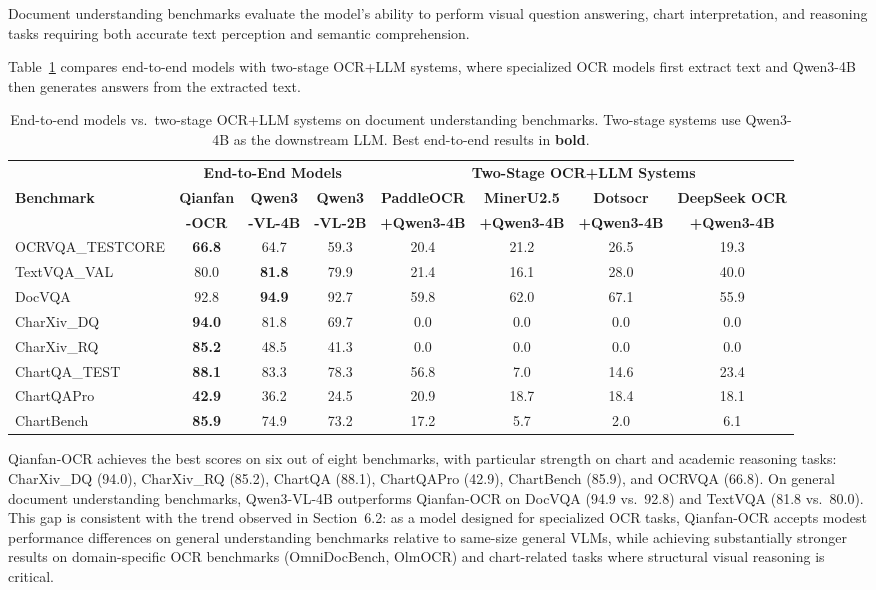 \documentclass[dvipsnames]{article}
\begin{document}
Document understanding benchmarks evaluate the model's ability to perform visual question answering, chart interpretation, and reasoning tasks requiring both accurate text perception and semantic comprehension.

Table~\ref{tab:doc_understanding_comparison} compares end-to-end models with two-stage OCR+LLM systems, where specialized OCR models first extract text and Qwen3-4B then generates answers from the extracted text.

\begin{table}[H]
\centering
\small
\setlength{\tabcolsep}{4pt}
\begin{tabular}{l|ccc|cccc}
\toprule
 & \multicolumn{3}{c|}{\textbf{End-to-End Models}} & \multicolumn{4}{c}{\textbf{Two-Stage OCR+LLM Systems}} \\
\cmidrule(lr){2-4} \cmidrule(lr){5-8}
\textbf{Benchmark} & \textbf{Qianfan} & \textbf{Qwen3} & \textbf{Qwen3} & \textbf{PaddleOCR} & \textbf{MinerU2.5} & \textbf{Dotsocr} & \textbf{DeepSeek OCR} \\
 & \textbf{-OCR} & \textbf{-VL-4B} & \textbf{-VL-2B} & \textbf{+Qwen3-4B} & \textbf{+Qwen3-4B} & \textbf{+Qwen3-4B} & \textbf{+Qwen3-4B} \\
\midrule
OCRVQA\_TESTCORE & \textbf{66.8} & 64.7 & 59.3 & 20.4 & 21.2 & 26.5 & 19.3 \\
TextVQA\_VAL & 80.0 & \textbf{81.8} & 79.9 & 21.4 & 16.1 & 28.0 & 40.0 \\
DocVQA & 92.8 & \textbf{94.9} & 92.7 & 59.8 & 62.0 & 67.1 & 55.9 \\
CharXiv\_DQ & \textbf{94.0} & 81.8 & 69.7 & 0.0 & 0.0 & 0.0 & 0.0 \\
CharXiv\_RQ & \textbf{85.2} & 48.5 & 41.3 & 0.0 & 0.0 & 0.0 & 0.0 \\
ChartQA\_TEST & \textbf{88.1} & 83.3 & 78.3 & 56.8 & 7.0 & 14.6 & 23.4 \\
ChartQAPro & \textbf{42.9} & 36.2 & 24.5 & 20.9 & 18.7 & 18.4 & 18.1 \\
ChartBench & \textbf{85.9} & 74.9 & 73.2 & 17.2 & 5.7 & 2.0 & 6.1 \\
\bottomrule
\end{tabular}
\caption{End-to-end models vs.\ two-stage OCR+LLM systems on document understanding benchmarks. Two-stage systems use Qwen3-4B as the downstream LLM. Best end-to-end results in \textbf{bold}.}
\label{tab:doc_understanding_comparison}
\end{table}

Qianfan-OCR achieves the best scores on six out of eight benchmarks, with particular strength on chart and academic reasoning tasks: CharXiv\_DQ (94.0), CharXiv\_RQ (85.2), ChartQA (88.1), ChartQAPro (42.9), ChartBench (85.9), and OCRVQA (66.8). On general document understanding benchmarks, Qwen3-VL-4B outperforms Qianfan-OCR on DocVQA (94.9 vs.\ 92.8) and TextVQA (81.8 vs.\ 80.0). This gap is consistent with the trend observed in Section~6.2: as a model designed for specialized OCR tasks, Qianfan-OCR accepts modest performance differences on general understanding benchmarks relative to same-size general VLMs, while achieving substantially stronger results on domain-specific OCR benchmarks (OmniDocBench, OlmOCR) and chart-related tasks where structural visual reasoning is critical.
\end{document}
